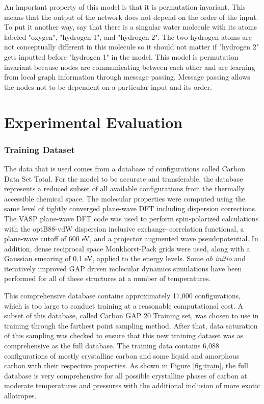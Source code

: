 \documentclass[12pt, abstract = true]{scrartcl}
\begin{document}
An important property of this model is that it is permutation invariant. This means that the output of 
the network does not depend on the order of the input. To put it another way, say that there is a singular
water molecule with its atoms labeled "oxygen", "hydrogen 1", and "hydrogen 2". The two hydrogen atoms 
are not conceptually different in this molecule so it should not matter if "hydrogen 2" gets inputted 
before "hydrogen 1" in the model. This model is permutation invariant because nodes are communicating 
between each other and are learning from local graph information through message passing. Message passing 
allows the nodes not to be dependent on a particular input and its order.




\newpage

\section{Experimental Evaluation}
\subsubsection{Training Dataset}\label{Train}
The data that is used comes from a database of configurations called Carbon Data Set Total\cite{gap20}. For the model to be accurate and transferable, the database represents a reduced subset of all available configurations from the thermally accessible chemical space. The molecular properties were computed using the same level of tightly converged plane-wave DFT including dispersion corrections. The VASP plane-wave DFT code was used to perform spin-polarized calculations with the optB88-vdW dispersion inclusive exchange–correlation functional, a plane-wave cutoff of 600 eV, and a projector augmented wave pseudopotential. In addition, dense reciprocal space Monkhorst-Pack grids were used, along with a Gaussian smearing of 0.1 eV, applied to the energy levels. Some \emph{ab initio} and iteratively improved GAP driven molecular dynamics simulations have been performed for all of these structures at a number of temperatures. 

This comprehensive database contains approximately 17,000 configurations, which is too large to conduct training at a reasonable computational cost. A subset of this database, called Carbon GAP 20 Training set, was chosen to use in training through the farthest point sampling method. After that, data saturation of this sampling was checked to ensure that this new training dataset was as comprehensive as the full database. The training data contains 6,088 configurations of mostly crystalline carbon and some liquid and amorphous carbon with their respective properties. As shown in Figure \ref{fig:train}, the full database is very comprehensive for all possible crystalline phases of carbon at moderate temperatures and pressures with the additional inclusion of more exotic allotropes. 
\end{document}

